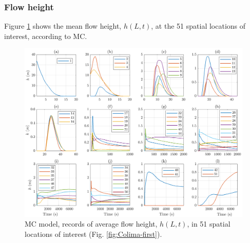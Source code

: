 \documentclass{article}
\begin{document}
\subsubsection{Flow height}
Figure \ref{fig:BAF-H-MC} shows the mean flow height, $h(L,t)$, at the 51 spatial locations of interest, according to MC.
\begin{figure}[H]
         \centering
        \includegraphics[width=1\textwidth]{MC&VS_51/Height_MC2.png}
        \caption{MC model, records of average flow height, $h(L,t)$, in 51 spatial locations of interest (Fig. \ref{fig:Colima-first}).}
        \label{fig:BAF-H-MC}
\end{figure}
\end{document}
